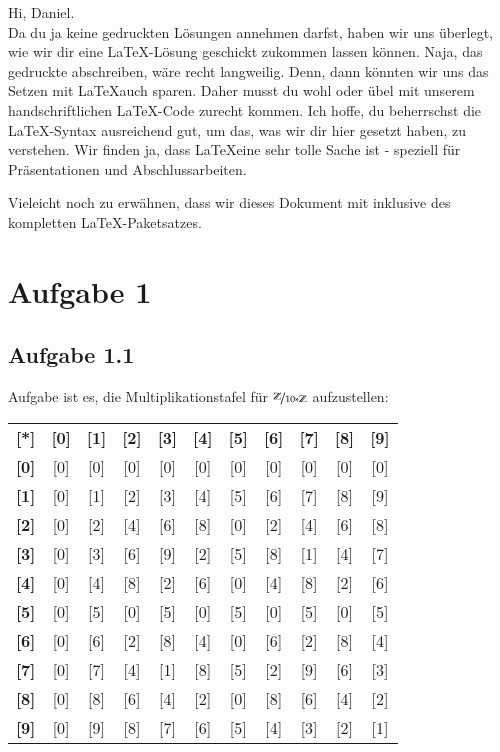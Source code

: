 \documentclass{article}
\newcommand*{\7}{\textbackslash}
\newcommand*{\Z}{{\mathbb{Z}}}
\theoremstyle{remark}
\theoremstyle{definition}
\begin{document}
	Hi, Daniel.\\
	Da du ja keine gedruckten L\"osungen annehmen darfst, haben wir uns \"uberlegt, wie wir dir eine \LaTeX{}-L\"osung geschickt zukommen lassen k\"onnen. Naja, das gedruckte abschreiben, w\"are recht langweilig. Denn, dann k\"onnten wir uns das Setzen mit \LaTeX auch sparen. Daher musst du wohl oder \"ubel mit unserem handschriftlichen \LaTeX{}-Code zurecht kommen. Ich hoffe, du beherrschst die \LaTeX{}-Syntax ausreichend gut, um das, was wir dir hier gesetzt haben, zu verstehen. Wir finden ja, dass \LaTeX eine sehr tolle Sache ist - speziell f\"ur Pr\"asentationen und Abschlussarbeiten.

	Vieleicht noch zu erw\"ahnen, dass wir dieses Dokument mit \LaTeXe in\-klu\-si\-ve des kompletten \LaTeX{}-Paketsatzes.

	\section*{Aufgabe 1}

	\subsection*{Aufgabe 1.1}

	Aufgabe ist es, die Multiplikationstafel f\"ur $\nicefrac{\Z}{10*\Z}$ aufzustellen:

	\begin{tabular}{lcccccccccc}
		\textbf{[*]}&\textbf{[0]}&\textbf{[1]}&\textbf{[2]}&\textbf{[3]}&\textbf{[4]}&\textbf{[5]}&\textbf{[6]}&\textbf{[7]}&\textbf{[8]}&\textbf{[9]}\\
		\textbf{[0]}&[0]&[0]&[0]&[0]&[0]&[0]&[0]&[0]&[0]&[0]\\
		\textbf{[1]}&[0]&[1]&[2]&[3]&[4]&[5]&[6]&[7]&[8]&[9]\\
		\textbf{[2]}&[0]&[2]&[4]&[6]&[8]&[0]&[2]&[4]&[6]&[8]\\
		\textbf{[3]}&[0]&[3]&[6]&[9]&[2]&[5]&[8]&[1]&[4]&[7]\\
		\textbf{[4]}&[0]&[4]&[8]&[2]&[6]&[0]&[4]&[8]&[2]&[6]\\
		\textbf{[5]}&[0]&[5]&[0]&[5]&[0]&[5]&[0]&[5]&[0]&[5]\\
		\textbf{[6]}&[0]&[6]&[2]&[8]&[4]&[0]&[6]&[2]&[8]&[4]\\
		\textbf{[7]}&[0]&[7]&[4]&[1]&[8]&[5]&[2]&[9]&[6]&[3]\\
		\textbf{[8]}&[0]&[8]&[6]&[4]&[2]&[0]&[8]&[6]&[4]&[2]\\
		\textbf{[9]}&[0]&[9]&[8]&[7]&[6]&[5]&[4]&[3]&[2]&[1]\\
	\end{tabular}
\end{document}

